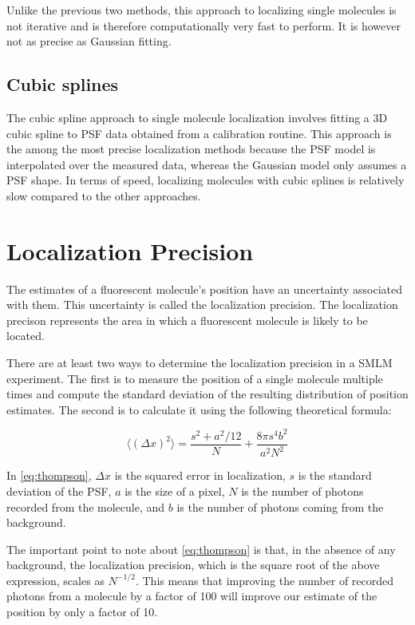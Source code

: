 \documentclass[10pt,a4paper,oneside]{book}
\begin{document}
Unlike the previous two methods, this approach to localizing single molecules is not iterative and is therefore computationally very fast to perform. It is however not as precise as Gaussian fitting.

\subsection{Cubic splines}

The cubic spline approach to single molecule localization involves fitting a 3D cubic spline to PSF data obtained from a calibration routine. This approach is the among the most precise localization methods because the PSF model is interpolated over the measured data, whereas the Gaussian model only assumes a PSF shape. In terms of speed, localizing molecules with cubic splines is relatively slow compared to the other approaches.

\section{Localization Precision}

The estimates of a fluorescent molecule's position have an uncertainty associated with them. This uncertainty is called the localization precision. The localization precison represents the area in which a fluorescent molecule is likely to be located.

There are at least two ways to determine the localization precision in a SMLM experiment. The first is to measure the position of a single molecule multiple times and compute the standard deviation of the resulting distribution of position estimates. The second is to calculate it using the following theoretical formula\cite{thompson-biophysicaljournal-2002}:

\begin{equation}
    \langle \left( \Delta x \right)^2 \rangle = \frac{s^2 + a^{2}/12}{N} + \frac{8 \pi s^4 b^2}{a^2 N^2}
    \label{eq:thompson}
\end{equation}

\noindent In \autoref{eq:thompson}, $\Delta x$ is the squared error in localization, $s$ is the standard deviation of the PSF, $a$ is the size of a pixel, $N$ is the number of photons recorded from the molecule, and $b$ is the number of photons coming from the background. 

The important point to note about \autoref{eq:thompson} is that, in the absence of any background, the localization precision, which is the square root of the above expression, scales as $N^{-1/2}$. This means that improving the number of recorded photons from a molecule by a factor of 100 will improve our estimate of the position by only a factor of 10.
\end{document}
